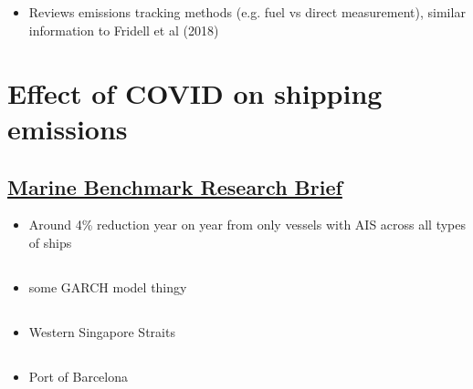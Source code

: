\documentclass{article}
\newcommand{\paperpath}{../resources/}
\newcommand{\myhref}[2]{\href{run:\paperpath#1}{#2}}
\begin{document}
\subsection{\myhref{Chen et al 2022 - Research on Ship Carbon Emission Statistical Optimization Based on MRV Rules.pdf}{\textcite{chen2022research}}}
\begin{itemize}
    \item Reviews emissions tracking methods (e.g. fuel vs direct measurement), similar information to Fridell et al (2018)
\end{itemize}

\section{Effect of COVID on shipping emissions}
\subsection{\myhref{Marine Benchmark 2020 - Maritime CO2 Emissions.pdf}{Marine Benchmark Research Brief}}
\begin{itemize}
    \item Around 4\% reduction year on year from only vessels with AIS across all types of ships
\end{itemize}
\subsection{\myhref{Xu et al 2023 - Impacts of the COVID-19 epidemic on carbon emissions from international shipping.pdf}{\textcite{xu2023impacts}}}
\begin{itemize}
    \item some GARCH model thingy
\end{itemize}
\subsection{\myhref{Ju et al 2021 - The impact of shipping CO2 emissions from marine traffic in Western.pdf}{\textcite{ju2021impact}}}
\begin{itemize}
    \item Western Singapore Straits
\end{itemize}
\subsection{\myhref{Mujal-Colilles 2022 - COVID-19 impact on maritime traffic and corresponding pollutant.pdf}{\textcite{mujal2022covid}}}
\begin{itemize}
    \item Port of Barcelona
\end{itemize}
\end{document}
